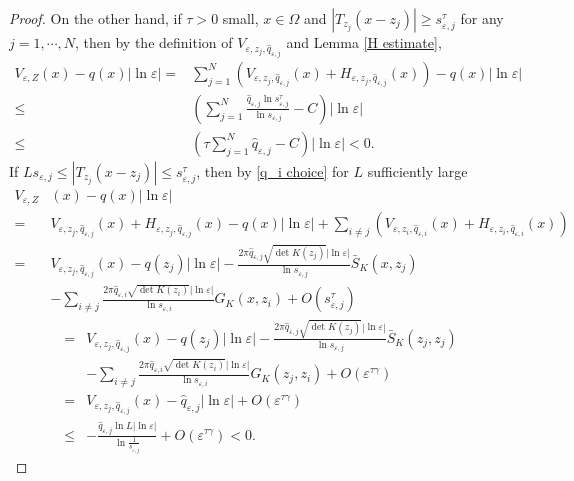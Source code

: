\documentclass[12pt,reqno]{amsart}
\numberwithin{equation}{section}
\theoremstyle{definition}
\theoremstyle{remark}
\begin{document}
\begin{proof}
	
	On the other hand, if $ \tau>0 $ small, $ x\in\Omega$  %
	and $ |T_{z_j}(x-z_j)|\geq s_{\varepsilon,j}^\tau $ for any $ j=1,\cdots,N $, then by the definition of $ V_{\varepsilon,z_j,\hat{q}_{\varepsilon,j}} $ and Lemma \ref{H estimate},
	\begin{equation*}
	\begin{split}
	V_{\varepsilon,Z}(x)-q(x)|\ln\varepsilon|=&\sum_{j=1}^N\left( V_{\varepsilon,z_j,\hat{q}_{\varepsilon,j}}(x)+H_{\varepsilon,z_j,\hat{q}_{\varepsilon,j}}(x)\right) -q(x)|\ln\varepsilon|\\
	\leq &\left( \sum_{j=1}^N\frac{\hat{q}_{\varepsilon,j}\ln s_{\varepsilon,j}^\tau}{\ln s_{\varepsilon,j}}-C\right)|\ln\varepsilon| \\
	\leq &\left( \tau \sum_{j=1}^N \hat{q}_{\varepsilon,j}-C\right) |\ln\varepsilon|<0.
	\end{split}
	\end{equation*}
	If $ Ls_{\varepsilon,j}\leq |T_{z_j}(x-z_j)|\leq s_{\varepsilon,j}^\tau $, then by \eqref{q_i choice} for $ L $ sufficiently large
	\begin{equation*}
	\begin{split}
	V_{\varepsilon,Z}&(x)-q(x)|\ln\varepsilon|\\
	=&V_{\varepsilon,z_j,\hat{q}_{\varepsilon,j}}(x)+H_{\varepsilon,z_j,\hat{q}_{\varepsilon,j}}(x)-q(x)|\ln\varepsilon|+\sum_{i\neq j}\left(V_{\varepsilon, z_i, \hat{q}_{\varepsilon,i}}(x)+H_{\varepsilon, z_i, \hat{q}_{\varepsilon,i}}(x)\right)\\
	=&V_{\varepsilon, z_j, \hat{q}_{\varepsilon,j}}(x)-q(z_j)|\ln\varepsilon|-\frac{2\pi\hat{q}_{\varepsilon,j}\sqrt{\det K(z_j)}|\ln\varepsilon|}{\ln s_{\varepsilon,j}}\bar{S}_K(x, z_j)\\
	&-\sum_{i\neq j}\frac{2\pi\hat{q}_{\varepsilon,i}\sqrt{\det K(z_i)}|\ln\varepsilon|}{\ln s_{\varepsilon,i}}G_K(x, z_i)+O(s_{\varepsilon,j}^\tau)
	\end{split}
\end{equation*}	
	\begin{equation*}
\begin{split}	
	=&V_{\varepsilon,z_j,\hat{q}_{\varepsilon,j}}(x)-q(z_j)|\ln\varepsilon|-\frac{2\pi\hat{q}_{\varepsilon,j}\sqrt{\det K(z_j)}|\ln\varepsilon|}{\ln s_{\varepsilon,j}}\bar{S}_K(z_j, z_j)\\
	&-\sum_{i\neq j}\frac{2\pi\hat{q}_{\varepsilon,i}\sqrt{\det K(z_i)}|\ln\varepsilon|}{\ln s_{\varepsilon,i}}G_K(z_j, z_i)
+O\left( \varepsilon^{\tau\gamma}\right) \\
	=&V_{\varepsilon,z_j,\hat{q}_{\varepsilon,j}}(x)-\hat{q}_{\varepsilon,j}|\ln\varepsilon|+O\left( \varepsilon^{\tau\gamma}\right) \\
	\leq &-\frac{\hat{q}_{\varepsilon,j}\ln L|\ln\varepsilon|}{\ln\frac{1}{s_{\varepsilon,j}}}+O\left( \varepsilon^{\tau\gamma}\right)<0.
	\end{split}
	\end{equation*}

	
	
	
	
\end{proof}
\end{document}
